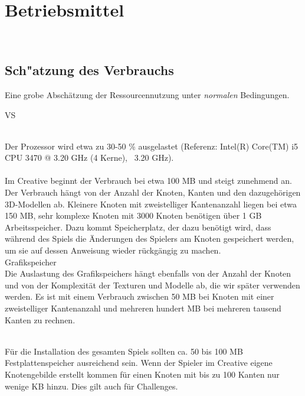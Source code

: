 %
%


\chapter{Betriebsmittel}
\label{BM}~\\

\section{Sch{"a}tzung des Verbrauchs}
\label{BM:Verbrauch}

Eine grobe Abschätzung der Ressourcennutzung unter \textit{normalen} Bedingungen.\\

\begin{ids}{\gls{VS}}

	 \hfill\\

	Der Prozessor wird etwa zu 30-50 \% ausgelastet (Referenz: Intel(R) Core(TM) i5 CPU 3470 @ 3.20 GHz (4 Kerne), ~3.20 GHz).\\
	
	 \hfill\\
	
	Im Creative beginnt der Verbrauch bei etwa 100 MB und steigt zunehmend an. Der Verbrauch hängt von der Anzahl der Knoten, Kanten und den dazugehörigen 3D-Modellen ab. Kleinere Knoten mit zweistelliger Kantenanzahl	liegen bei etwa 150 MB, sehr komplexe Knoten mit 3000 Knoten benötigen über 1 GB Arbeitsspeicher. Dazu kommt Speicherplatz, der dazu benötigt wird, dass während des Spiels die Änderungen des Spielers am Knoten gespeichert werden, um sie auf dessen Anweisung wieder rückgängig zu machen.\\

	\id[30] Grafikspeicher \hfill\\
	
	Die Auslastung des Grafikspeichers hängt ebenfalls von der Anzahl der Knoten und von der Komplexität der Texturen und Modelle ab, die wir später verwenden werden. Es ist mit einem Verbrauch zwischen 50 MB bei Knoten mit einer zweistelliger Kantenanzahl und mehreren hundert MB bei mehreren tausend Kanten zu rechnen.

	 \hfill\\
		
	Für die Installation des gesamten Spiels sollten ca. 50 bis 100 MB Festplattenspeicher ausreichend sein. Wenn der Spieler im Creative eigene Knotengebilde erstellt kommen für einen Knoten mit bis zu 100 Kanten nur wenige KB hinzu. Dies gilt auch für Challenges.\\

\end{ids}


